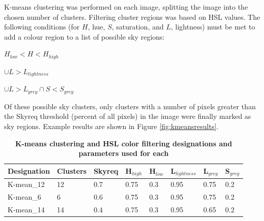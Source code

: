 \documentclass[final,3p,times,authoryear]{elsarticle}
\begin{document}
K-means clustering was performed on each image, splitting the image into the chosen number of clusters. Filtering cluster regions was based on HSL values. The following conditions (for $H$, hue, $S$, saturation, and $L$, lightness) must be met to add a colour region to a list of possible sky regions: 

$H_{low} < H < H_{high}$

$\cup L > L_{lightness}$

$\cup L > L_{grey} \cap S < S_{grey}$

Of these possible sky clusters, only clusters with a number of pixels greater than the Skyreq threshold (percent of all pixels) in the image were finally marked as sky regions. Example results are shown in Figure \ref{fig:kmeansresults}. 

\begin{table}[!htbp]
\caption{\bf K-means clustering and HSL color filtering designations and parameters used for each \label{tab:techniques3}}     
\begin{tabular}{ l l l l l l l l}
\textbf{Designation} & \textbf{Clusters} & \textbf{Skyreq}&\textbf{H$_{high}$}&\textbf{H$_{low}$} & \textbf{L$_{lightness}$} & \textbf{L$_{grey}$}& \textbf{S$_{grey}$} \\ \hline
K-mean\_12  & 12 & 0.7& 0.75& 0.3 & 0.95 & 0.75 & 0.2 \\
K-mean\_6  & 6 & 0.6& 0.75& 0.3 & 0.95 & 0.75 & 0.2 \\
K-mean\_14  & 14 & 0.4& 0.75& 0.3 & 0.95 & 0.65 & 0.2 \\
\hline
\end{tabular}
\end{table}
\end{document}
